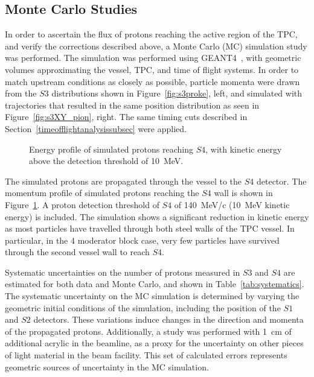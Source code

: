 \subsection{Monte Carlo Studies}
In order to ascertain the flux of protons reaching the active region of the TPC, and verify the corrections described above, a Monte Carlo (MC) simulation study was performed.
The simulation was performed using GEANT4~\cite{brun1993geant}, with geometric volumes approximating the vessel, TPC, and time of flight systems.
In order to match upstream conditions as closely as possible, particle momenta were drawn from the $\mathit{S3}$ distributions shown in Figure~\ref{fig:s3proke}, left, and simulated with trajectories that resulted in the same position distribution as seen in Figure~\ref{fig:s3XY_pion}, right.
The same timing cuts described in Section~\ref{timeofflightanalysissubsec} were applied.

\begin{figure}[ht]
  \centering
     \begin{adjustbox}{max totalsize={\textwidth}{.35\textheight}, center}
      
    \end{adjustbox}
    \caption{Energy profile of simulated protons reaching $\mathit{S4}$, with kinetic energy above the detection threshold of 10~MeV.}
    \label{fig:MCS4}
\end{figure}

The simulated protons are propagated through the vessel to the $\mathit{S4}$ detector.
The momentum profile of simulated protons reaching the $\mathit{S4}$ wall is shown in Figure~\ref{fig:MCS4}.
A proton detection threshold of $\mathit{S4}$ of 140~MeV/c (10~MeV kinetic energy) is included.
The simulation shows a significant reduction in kinetic energy as most particles have travelled through both steel walls of the TPC vessel.
In particular, in the 4 moderator block case, very few particles have survived through the second vessel wall to reach $\mathit{S4}$.

Systematic uncertainties on the number of protons measured in $\mathit{S3}$ and $\mathit{S4}$ are estimated for both data and Monte Carlo, and shown in Table~\ref{tab:systematics}.
The systematic uncertainty on the MC simulation is determined by varying the geometric initial conditions of the simulation, including the position of the $\mathit{S1}$ and $\mathit{S2}$ detectors.
These variations induce changes in the direction and momenta of the propagated protons.
Additionally, a study was performed with 1~cm of additional acrylic in the beamline, as a proxy for the uncertainty on other pieces of light material in the beam facility.
This set of calculated errors represents geometric sources of uncertainty in the MC simulation.

